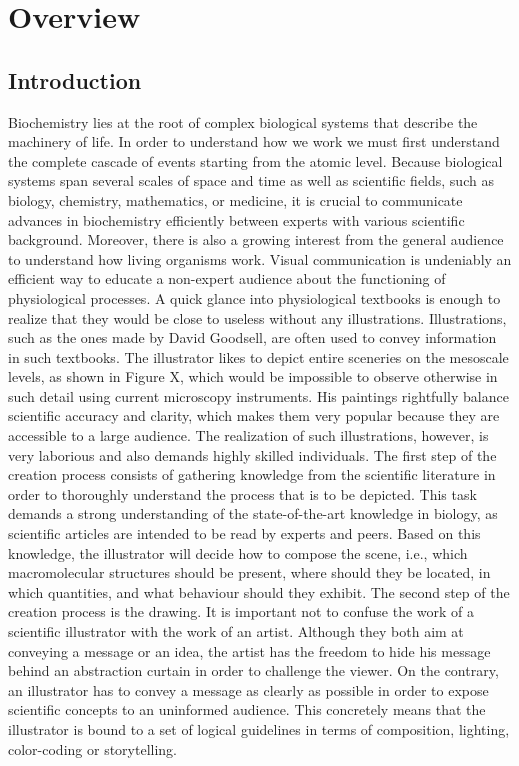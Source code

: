 \chapter{Overview}

\section{Introduction}

Biochemistry lies at the root of complex biological systems that describe the machinery of life.
In order to understand how we work we must first understand the complete cascade of events starting from the atomic level.
Because biological systems span several scales of space and time as well as scientific fields, such as biology, chemistry, mathematics, or medicine, it is crucial to communicate advances in biochemistry efficiently between experts with various scientific background.
Moreover, there is also a growing interest from the general audience to understand how living organisms work.
Visual communication is undeniably an efficient way to educate a non-expert audience about the functioning of physiological processes.
A quick glance into physiological textbooks is enough to realize that they would be close to useless without any illustrations.
Illustrations, such as the ones made by David Goodsell, are often used to convey information in such textbooks.
The illustrator likes to depict entire sceneries on the mesoscale levels, as shown in Figure X, which would be impossible to observe otherwise in such detail using current microscopy instruments.
His paintings rightfully balance scientific accuracy and clarity, which makes them very popular because they are accessible to a large audience. 
The realization of such illustrations, however, is very laborious and also demands highly skilled individuals.
The first step of the creation process consists of gathering knowledge from the scientific literature in order to thoroughly understand the process that is to be depicted.
This task demands a strong understanding of the state-of-the-art knowledge in biology, as scientific articles are intended to be read by experts and peers.
Based on this knowledge, the illustrator will decide how to compose the scene, i.e., which macromolecular structures should be present, where should they be located, in which quantities, and what behaviour should they exhibit.
The second step of the creation process is the drawing. 
It is important not to confuse the work of a scientific illustrator with the work of an artist.
Although they both aim at conveying a message or an idea, the artist has the freedom to hide his message behind an abstraction curtain in order to challenge the viewer.
On the contrary, an illustrator has to convey a message as clearly as possible in order to expose scientific concepts to an uninformed audience.
This concretely means that the illustrator is bound to a set of logical guidelines in terms of composition, lighting, color-coding or storytelling.

